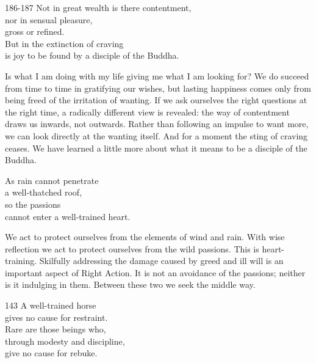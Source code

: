 
\begin{dhpVerse}{186-187}
\label{dhp-186}\label{dhp-187}
Not in great wealth is there contentment,\\
nor in sensual pleasure,\\
gross or refined.\\
But in the extinction of craving\\
is joy to be found by a disciple of the Buddha.
\end{dhpVerse}

\begin{dhpRefl}

Is what I am doing with my life giving me what I am looking for? We
do succeed from time to time in gratifying our wishes, but lasting
happiness comes only from being freed of the irritation of wanting.
If we ask ourselves the right questions at the right time, a
radically different view is revealed: the way of contentment draws us
inwards, not outwards. Rather than following an impulse to want more,
we can look directly at the wanting itself. And for a moment the
sting of craving ceases. We have learned a little more about what it
means to be a disciple of the Buddha.

\end{dhpRefl}


\begin{dhpVerse}{14}
\label{dhp-14}
As rain cannot penetrate\\
a well-thatched roof,\\
so the passions\\
cannot enter a well-trained heart.
\end{dhpVerse}

\begin{dhpRefl}

We act to protect ourselves from the elements of wind and rain. With
wise reflection we act to protect ourselves from the wild passions.
This is heart-training. Skilfully addressing the damage caused by
greed and ill will is an important aspect of Right Action. It is not
an avoidance of the passions; neither is it indulging in them.
Between these two we seek the middle way.

\end{dhpRefl}


\begin{dhpVerse}{143}
\label{dhp-143}
A well-trained horse\\
gives no cause for restraint.\\
Rare are those beings who,\\
through modesty and discipline,\\
give no cause for rebuke.
\end{dhpVerse}

